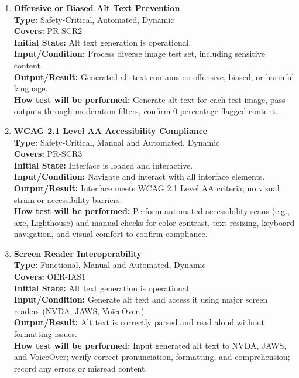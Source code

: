 \documentclass[12pt, titlepage]{article}
\begin{document}
\begin{enumerate}[label=NFR-ST \arabic*., wide=0pt, leftmargin=*]
  \item \textbf{Offensive or Biased Alt Text Prevention} \\[2mm]
    \textbf{Type:} Safety-Critical, Automated, Dynamic \\
    \textbf{Covers:} PR-SCR2 \\
    \textbf{Initial State:} Alt text generation is operational. \\
    \textbf{Input/Condition:} Process diverse image test set,
    including sensitive content. \\
    \textbf{Output/Result:} Generated alt text contains no offensive,
    biased, or harmful language. \\[2mm]
    \textbf{How test will be performed:}
    Generate alt text for each test image, pass outputs through
    moderation filters, confirm 0 percentage flagged content.

  \item \textbf{WCAG 2.1 Level AA Accessibility Compliance} \\[2mm]
    \textbf{Type:} Safety-Critical, Manual and Automated, Dynamic \\
    \textbf{Covers:} PR-SCR3 \\
    \textbf{Initial State:} Interface is loaded and interactive. \\
    \textbf{Input/Condition:} Navigate and interact with all
    interface elements. \\
    \textbf{Output/Result:} Interface meets WCAG 2.1 Level AA
    criteria; no visual strain or accessibility barriers. \\[2mm]
    \textbf{How test will be performed:}
    Perform automated accessibility scans (e.g., axe, Lighthouse) and
    manual checks for color contrast, text resizing, keyboard
    navigation, and visual comfort to confirm compliance.

  \item \textbf{Screen Reader Interoperability} \\[2mm]
    \textbf{Type:} Functional, Manual and Automated, Dynamic \\
    \textbf{Covers:} OER-IAS1 \\
    \textbf{Initial State:} Alt text generation is operational. \\
    \textbf{Input/Condition:} Generate alt text and access it using
    major screen readers (NVDA, JAWS, VoiceOver.) \\
    \textbf{Output/Result:} Alt text is correctly parsed and read
    aloud without formatting issues. \\[2mm]
    \textbf{How test will be performed:}
    Input generated alt text to NVDA, JAWS, and VoiceOver; verify
    correct pronunciation, formatting, and comprehension; record any
    errors or misread content.


\end{enumerate}
\end{document}
